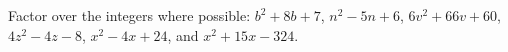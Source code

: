 Factor over the integers where possible: $b^2+8b+7$, $n^2-5n+6$, $6v^2+66v+60$, $4z^2-4z-8$, $x^2-4x+24$, and $x^2+15x-324$.
